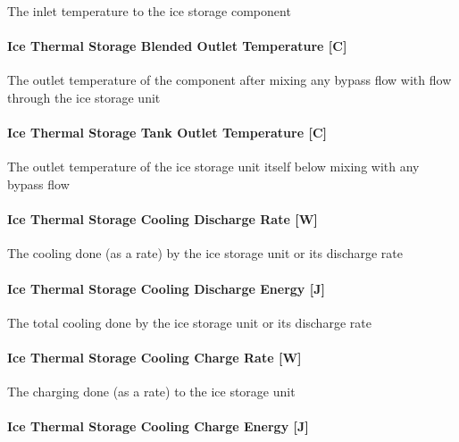 The inlet temperature to the ice storage component

\paragraph{Ice Thermal Storage Blended Outlet Temperature {[}C{]}}\label{ice-thermal-storage-blended-outlet-temperature-c}

The outlet temperature of the component after mixing any bypass flow with flow through the ice storage unit

\paragraph{Ice Thermal Storage Tank Outlet Temperature {[}C{]}}\label{ice-thermal-storage-tank-outlet-temperature-c}

The outlet temperature of the ice storage unit itself below mixing with any bypass flow

\paragraph{Ice Thermal Storage Cooling Discharge Rate {[}W{]}}\label{ice-thermal-storage-cooling-discharge-rate-w-1}

The cooling done (as a rate) by the ice storage unit or its discharge rate

\paragraph{Ice Thermal Storage Cooling Discharge Energy {[}J{]}}\label{ice-thermal-storage-cooling-discharge-energy-j-1}

The total cooling done by the ice storage unit or its discharge rate

\paragraph{Ice Thermal Storage Cooling Charge Rate {[}W{]}}\label{ice-thermal-storage-cooling-charge-rate-w-1}

The charging done (as a rate) to the ice storage unit

\paragraph{Ice Thermal Storage Cooling Charge Energy {[}J{]}}\label{ice-thermal-storage-cooling-charge-energy-j-1}

